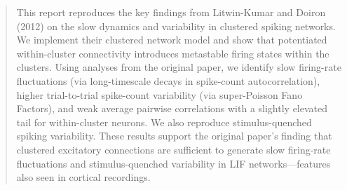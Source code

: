 \begin{abstract}
    This report reproduces the key findings from Litwin-Kumar and Doiron
    (2012) on the slow dynamics and variability in clustered spiking
    networks. We implement their clustered network model and show that
    potentiated within-cluster connectivity introduces metastable firing
    states within the clusters. Using analyses from the original paper, we
    identify slow firing-rate fluctuations (via long-timescale decays in
    spike-count autocorrelation), higher trial-to-trial spike-count
    variability (via super-Poisson Fano Factors), and weak average pairwise
    correlations with a slightly elevated tail for within-cluster neurons.
    We also reproduce stimulus-quenched spiking variability. These results
    support the original paper's finding that clustered excitatory
    connections are sufficient to generate slow firing-rate fluctuations
    and stimulus-quenched variability in LIF networks---features also seen
    in cortical recordings.
\end{abstract}
